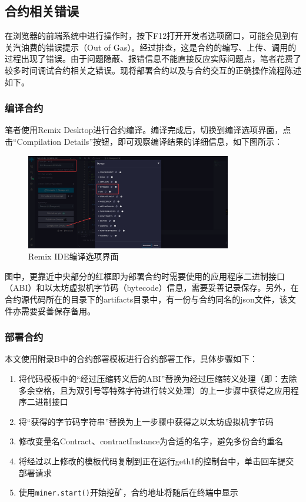 \subsection{合约相关错误}

在浏览器的前端系统中进行操作时，按下F12打开开发者选项窗口，可能会见到有关汽油费的错误提示（Out of Gas）。经过排查，这是合约的编写、上传、调用的过程出现了错误。由于问题隐蔽、报错信息不能直接反应实际问题点，笔者花费了较多时间调试合约相关之错误。现将部署合约以及与合约交互的正确操作流程陈述如下。

\subsubsection{编译合约}

笔者使用Remix Desktop进行合约编译。编译完成后，切换到编译选项界面，点击“Compilation Details”按钮，即可观察编译结果的详细信息，如下图所示：

\begin{figure}[htbp]
    \centering
    \includegraphics[width=0.8\textwidth]{images/remix.png}
    \caption{Remix IDE编译选项界面}\label{Remix IDE编译选项界面} %
\end{figure}

图中，更靠近中央部分的红框即为部署合约时需要使用的应用程序二进制接口（ABI）和以太坊虚拟机字节码（bytecode）信息，需要妥善记录保存。另外，在合约源代码所在的目录下的artifacts目录中，有一份与合约同名的json文件，该文件亦需要妥善保存备用。

\subsubsection{部署合约}

本文使用附录B中的合约部署模板进行合约部署工作，具体步骤如下：

\begin{enumerate}
    \item 将代码模板中的“经过压缩转义后的ABI”替换为经过压缩转义处理（即：去除多余空格，且为双引号等特殊字符进行转义处理）的上一步骤中获得之应用程序二进制接口
    \item 将“获得的字节码字符串”替换为上一步骤中获得之以太坊虚拟机字节码
    \item 修改变量名Contract、contractInstance为合适的名字，避免多份合约重名
    \item 将经过以上修改的模板代码复制到正在运行geth1的控制台中，单击回车提交部署请求
    \item 使用\verb|miner.start()|开始挖矿，合约地址将随后在终端中显示
\end{enumerate}

